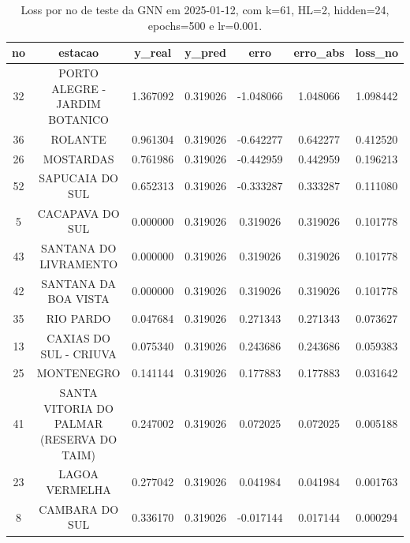 \begin{table}[h]
\centering
\caption{Loss por no de teste da GNN em 2025-01-12, com k=61, HL=2, hidden=24, epochs=500 e lr=0.001.}
\label{tab:gnn_loss_k61_hl2_h24_e500_d20250112}
\begin{tabular}{ccccccc}
\toprule
no & estacao & y\_real & y\_pred & erro & erro\_abs & loss\_no \\
\midrule
32 & PORTO ALEGRE - JARDIM BOTANICO & 1.367092 & 0.319026 & -1.048066 & 1.048066 & 1.098442 \\
36 & ROLANTE & 0.961304 & 0.319026 & -0.642277 & 0.642277 & 0.412520 \\
26 & MOSTARDAS & 0.761986 & 0.319026 & -0.442959 & 0.442959 & 0.196213 \\
52 & SAPUCAIA DO SUL & 0.652313 & 0.319026 & -0.333287 & 0.333287 & 0.111080 \\
5 & CACAPAVA DO SUL & 0.000000 & 0.319026 & 0.319026 & 0.319026 & 0.101778 \\
43 & SANTANA DO LIVRAMENTO & 0.000000 & 0.319026 & 0.319026 & 0.319026 & 0.101778 \\
42 & SANTANA DA BOA VISTA & 0.000000 & 0.319026 & 0.319026 & 0.319026 & 0.101778 \\
35 & RIO PARDO & 0.047684 & 0.319026 & 0.271343 & 0.271343 & 0.073627 \\
13 & CAXIAS DO SUL - CRIUVA & 0.075340 & 0.319026 & 0.243686 & 0.243686 & 0.059383 \\
25 & MONTENEGRO & 0.141144 & 0.319026 & 0.177883 & 0.177883 & 0.031642 \\
41 & SANTA VITORIA DO PALMAR (RESERVA DO TAIM) & 0.247002 & 0.319026 & 0.072025 & 0.072025 & 0.005188 \\
23 & LAGOA VERMELHA & 0.277042 & 0.319026 & 0.041984 & 0.041984 & 0.001763 \\
8 & CAMBARA DO SUL & 0.336170 & 0.319026 & -0.017144 & 0.017144 & 0.000294 \\
\bottomrule
\end{tabular}
\end{table}
